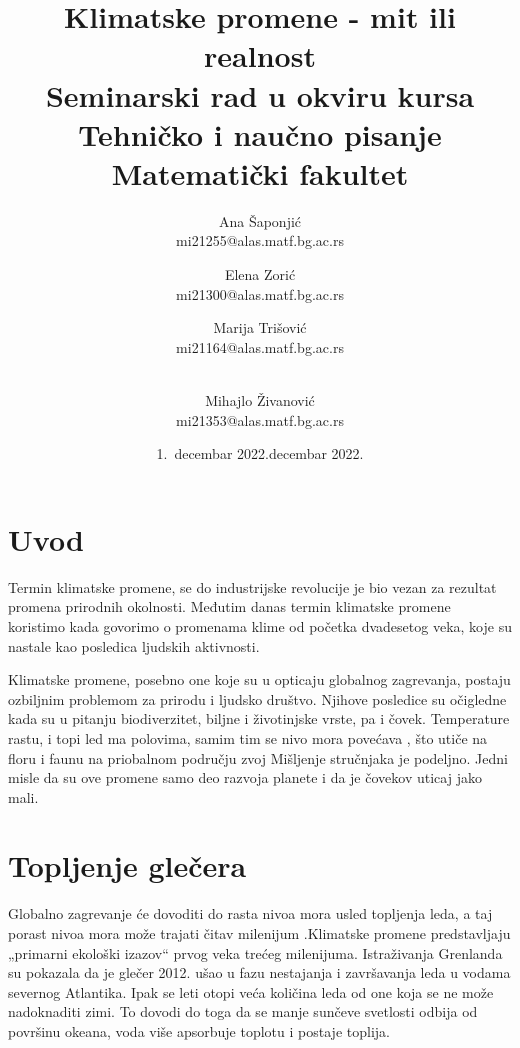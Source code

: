 \documentclass[a4paper]{article}
\begin{document}
\title{Klimatske promene - mit ili realnost\\ \small{Seminarski rad u okviru kursa\\Tehničko i naučno pisanje\\ Matematički fakultet}}


\author{Ana Šaponjić\\ mi21255@alas.matf.bg.ac.rs \and Elena Zorić\\ mi21300@alas.matf.bg.ac.rs \and Marija Trišović\\ mi21164@alas.matf.bg.ac.rs\and \\Mihajlo Živanović\\ mi21353@alas.matf.bg.ac.rs }
\date{1.~decembar 2022.}


\date{decembar 2022.}
\maketitle
{}

\tableofcontents

\newpage

\section{Uvod}
\label{sec:uvod}
Termin klimatske promene, se do industrijske revolucije je bio vezan za rezultat promena prirodnih okolnosti. Međutim danas termin klimatske promene koristimo kada govorimo o promenama klime od početka dvadesetog veka, koje su nastale kao posledica ljudskih aktivnosti.


Klimatske promene, posebno one koje su u opticaju globalnog zagrevanja, postaju ozbiljnim problemom za prirodu i ljudsko društvo. Njihove posledice su očigledne kada su u pitanju biodiverzitet, biljne i životinjske vrste, pa i čovek. Temperature rastu, i topi led ma polovima, samim tim se nivo mora povećava , što utiče na floru i faunu na priobalnom području zvoj 
Mišljenje stručnjaka je podeljno. Jedni misle da su ove promene samo deo razvoja planete i da je čovekov uticaj jako mali.




\section{Topljenje glečera}
\label{sec:toplenje_glečera}
Globalno zagrevanje će dovoditi do rasta nivoa mora usled topljenja leda, a taj porast nivoa mora može trajati čitav milenijum .Klimatske promene predstavljaju „primarni ekološki izazov“ prvog veka trećeg milenijuma. Istraživanja Grenlanda su pokazala da je glečer 2012. ušao u fazu nestajanja i završavanja leda u vodama severnog Atlantika. Ipak se leti otopi veća količina leda od one koja se ne može nadoknaditi zimi. To dovodi do toga da se manje sunčeve svetlosti odbija od površinu okeana, voda više apsorbuje toplotu i postaje toplija.
\end{document}
